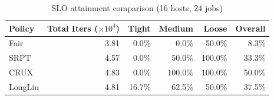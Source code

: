 \begin{table}[t]
\centering
\caption{SLO attainment comparison (16 hosts, 24 jobs)}
\label{tab:slo_16host}
\begin{tabular}{l|r|r|r|r|r}
\hline
Policy & Total Iters ($\times 10^4$) & Tight & Medium & Loose & Overall \\
\hline
Fair & 3.81 & 0.0\% & 0.0\% & 50.0\% & 8.3\% \\
SRPT & 4.57 & 0.0\% & 50.0\% & 100.0\% & 33.3\% \\
CRUX & 4.83 & 0.0\% & 100.0\% & 100.0\% & 50.0\% \\
LongLiu & 4.81 & 16.7\% & 62.5\% & 50.0\% & 37.5\% \\
\hline
\end{tabular}
\end{table}
